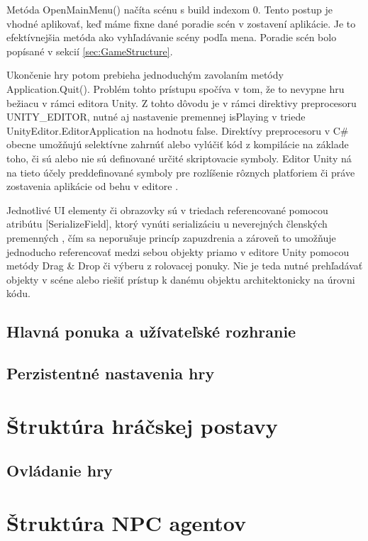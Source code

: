 \documentclass[slovak, master]{diploma}
\begin{document}
Metóda OpenMainMenu() načíta scénu s build indexom 0. Tento postup je vhodné aplikovať, keď máme fixne dané poradie scén v zostavení aplikácie. Je to efektívnejšia metóda ako vyhľadávanie scény podľa mena. Poradie scén bolo popísané v sekcií \ref{sec:GameStructure}. 

Ukončenie hry potom prebieha jednoduchým zavolaním metódy Application.Quit(). Problém tohto prístupu spočíva v tom, že to nevypne hru bežiacu v rámci editora Unity. Z tohto dôvodu je v rámci direktivy preprocesoru UNITY\_EDITOR, nutné aj nastavenie premennej isPlaying v triede UnityEditor.EditorApplication na hodnotu false. Direktívy preprocesoru v C\# obecne umožňujú selektívne zahrnúť alebo vylúčiť kód z kompilácie na základe toho, či sú alebo nie sú definované určité skriptovacie symboly. Editor Unity ná na tieto účely preddefinované symboly pre rozlíšenie rôznych platforiem či práve zostavenia aplikácie od behu v editore \cite{ConditionalCompilation}.

Jednotlivé UI elementy či obrazovky sú v triedach referencované pomocou atribútu [SerializeField], ktorý vynúti serializáciu u neverejných členských premenných \cite{SerializeField}, čím sa neporušuje princíp zapuzdrenia a zároveň to umožňuje jednoducho referencovať medzi sebou objekty priamo v editore Unity pomocou metódy Drag & Drop či výberu z rolovacej ponuky. Nie je teda nutné prehľadávať objekty v scéne alebo riešiť prístup k danému objektu architektonicky na úrovni kódu. 

\subsection{Hlavná ponuka a užívateľské rozhranie}
\label{sec:MainMenuAndUI}
\subsection{Perzistentné nastavenia hry}
\label{sec:Settings}


\section{Štruktúra hráčskej postavy}
\label{sec:Player}
\subsection{Ovládanie hry}
\label{sec:Input} %
\section{Štruktúra NPC agentov}
\label{sec:Agents}
\end{document}
